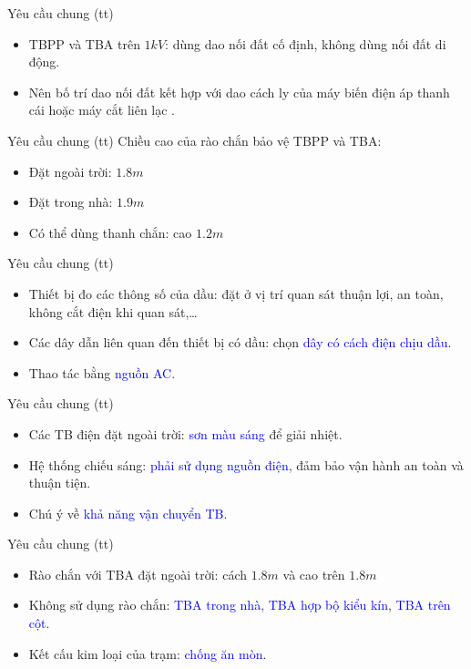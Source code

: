 \documentclass[20pt]{beamer}
\newcommand{\noibat}[1]{\textcolor{blue}{#1}} %
\begin{document}
\begin{frame}{Yêu cầu chung (tt)}
	\begin{itemize}
	\justifying
		\item TBPP và TBA trên $1kV$: dùng dao nối đất cố định, không dùng nối đất di động.
		\item Nên bố trí dao nối đất kết hợp với dao cách ly của máy biến điện áp thanh cái hoặc máy cắt liên lạc .
	\end{itemize}
\end{frame}

\begin{frame}{Yêu cầu chung (tt)}
\justifying
	Chiều cao của rào chắn bảo vệ TBPP và TBA:
	\begin{itemize}
	\justifying
		\item Đặt ngoài trời: $1.8m$
		\item Đặt trong nhà: $1.9m$
		\item Có thể dùng thanh chắn: cao $1.2m$
	\end{itemize}
\end{frame}

\begin{frame}{Yêu cầu chung (tt)}
	\begin{itemize}
	\justifying
		\item Thiết bị đo các thông số của dầu: đặt ở vị trí quan sát thuận lợi, an toàn, không cắt điện khi quan sát,\ldots
		\item Các dây dẫn liên quan đến thiết bị có dầu: chọn \noibat{dây có cách điện chịu dầu}.
		
		\item \alert{Thao tác} bằng \noibat{nguồn AC}.
	\end{itemize}
\end{frame}

\begin{frame}{Yêu cầu chung (tt)}
	\begin{itemize}
	\justifying
		\item \alert{Các TB điện đặt ngoài trời:} \noibat{sơn màu sáng} để giải nhiệt.
		
		\item Hệ thống chiếu sáng: \noibat{phải sử dụng nguồn điện}, đảm bảo vận hành an toàn và thuận tiện.
		
		\item Chú ý về \noibat{khả năng vận chuyển TB}.
	\end{itemize}
\end{frame}

\begin{frame}{Yêu cầu chung (tt)}
	\begin{itemize}
	\justifying
		\item Rào chắn với TBA đặt ngoài trời: cách $1.8m$ và cao trên $1.8m$
		\item \alert{Không sử dụng rào chắn}: \noibat{TBA trong nhà}, \noibat{TBA hợp bộ kiểu kín}, \noibat{TBA trên cột}.
		\item Kết cấu kim loại của trạm: \noibat{chống ăn mòn}.
	\end{itemize}
\end{frame}
\end{document}
